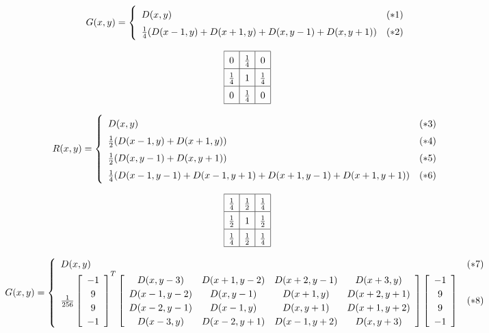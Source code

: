 \documentclass{article}
\begin{document}
\[ {\renewcommand\arraystretch{1.5} G(x,y) = \left\{ \begin{array}{ll} D(x,y) & (*1) \\ \frac{1}{4}( D(x-1,y) + D(x+1,y) + D(x,y-1) + D(x,y+1) ) & (*2) \\ \end{array} \right. } \]
\pagebreak

\[ {\renewcommand\arraystretch{1.5} \begin{array}{|c|c|c|} \hline 0 & \frac{1}{4} & 0 \\ \hline \frac{1}{4} & 1 & \frac{1}{4} \\ \hline 0 & \frac{1}{4} & 0 \\ \hline \end{array} } \]
\pagebreak

\[ {\renewcommand\arraystretch{1.5} R(x,y) = \left\{ \begin{array}{ll} D(x,y) & (*3) \\ \frac{1}{2}( D(x-1,y) + D(x+1,y) ) & (*4) \\ \frac{1}{2}( D(x,y-1) + D(x,y+1) ) & (*5) \\ \frac{1}{4}( D(x-1,y-1) + D(x-1,y+1) + D(x+1,y-1) + D(x+1,y+1) ) & (*6) \end{array}\right. } \]
\pagebreak

\[ {\renewcommand\arraystretch{1.5} \begin{array}{|c|c|c|} \hline \frac{1}{4} & \frac{1}{2} & \frac{1}{4} \\ \hline \frac{1}{2} & 1 & \frac{1}{2} \\ \hline \frac{1}{4} & \frac{1}{2} & \frac{1}{4} \\ \hline \end{array} } \]
\pagebreak

\[ {\renewcommand\arraystretch{1.2} G(x,y) = \left\{\begin{array}{ll}D(x,y) & (*7) \\ \frac{1}{256} \left[\begin{array}{c} -1 \\ 9 \\ 9 \\ -1 \end{array}\right]^T \left[\begin{array}{cccc} D(x,y-3) & D(x+1,y-2) & D(x+2,y-1) & D(x+3,y) \\ D(x-1,y-2) & D(x,y-1) & D(x+1,y) & D(x+2,y+1) \\ D(x-2,y-1) & D(x-1,y) & D(x,y+1) & D(x+1,y+2) \\ D(x-3,y) & D(x-2,y+1) & D(x-1,y+2) & D(x,y+3) \end{array}\right] \left[\begin{array}{c} -1 \\ 9 \\ 9 \\ -1 \end{array}\right] & (*8)\end{array}\right. } \]
\pagebreak
\end{document}
